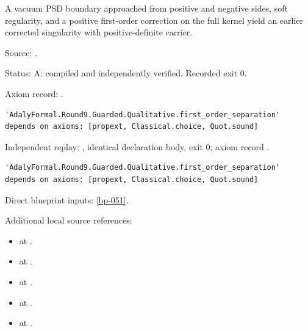 \begin{theorem}[bp-102]
\label{bp-102}
\leanok
A vacuum PSD boundary approached from positive and negative sides, soft regularity, and a positive first-order correction on the full kernel yield an earlier corrected singularity with positive-definite carrier.

\par Source: \texttt{}.
\par Status: A: compiled and independently verified. Recorded exit 0.
\par Axiom record: \texttt{}.
\begin{verbatim}
'AdalyFormal.Round9.Guarded.Qualitative.first_order_separation' depends on axioms: [propext, Classical.choice, Quot.sound]
\end{verbatim}
\par Independent replay: \texttt{}, identical declaration body, exit 0; axiom record \texttt{}.
\begin{verbatim}
'AdalyFormal.Round9.Guarded.Qualitative.first_order_separation' depends on axioms: [propext, Classical.choice, Quot.sound]
\end{verbatim}
\par Direct blueprint inputs: \ref{bp-051}.
\par Additional local source references:
\begin{itemize}
\item \texttt{} at \texttt{}.
\item \texttt{} at \texttt{}.
\item \texttt{} at \texttt{}.
\item \texttt{} at \texttt{}.
\item \texttt{} at \texttt{}.

\end{itemize}
\end{theorem}
